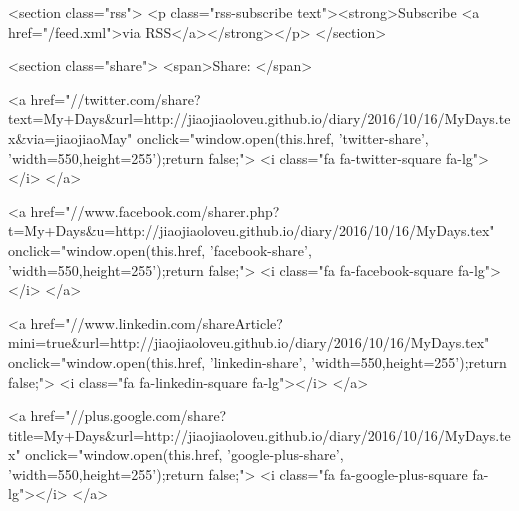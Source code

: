 <section class="rss">
  <p class="rss-subscribe text"><strong>Subscribe <a href="/feed.xml">via RSS</a></strong></p>
</section>

<section class="share">
  <span>Share: </span>
  
    
    
      <a href="//twitter.com/share?text=My+Days&url=http://jiaojiaoloveu.github.io/diary/2016/10/16/MyDays.tex&via=jiaojiaoMay"
        onclick="window.open(this.href, 'twitter-share', 'width=550,height=255');return false;">
        <i class="fa fa-twitter-square fa-lg"></i>
      </a>
    
    
    
    
    
    
  
    
    
    
      <a href="//www.facebook.com/sharer.php?t=My+Days&u=http://jiaojiaoloveu.github.io/diary/2016/10/16/MyDays.tex"
        onclick="window.open(this.href, 'facebook-share', 'width=550,height=255');return false;">
        <i class="fa fa-facebook-square fa-lg"></i>
      </a>
    
    
    
    
    
  
    
    
    
    
    
    
    
  
    
    
    
    
    
      <a href="//www.linkedin.com/shareArticle?mini=true&url=http://jiaojiaoloveu.github.io/diary/2016/10/16/MyDays.tex"
        onclick="window.open(this.href, 'linkedin-share', 'width=550,height=255');return false;">
        <i class="fa fa-linkedin-square fa-lg"></i>
      </a>
    
    
    
  
    
    
    
    
      <a href="//plus.google.com/share?title=My+Days&url=http://jiaojiaoloveu.github.io/diary/2016/10/16/MyDays.tex"
        onclick="window.open(this.href, 'google-plus-share', 'width=550,height=255');return false;">
        <i class="fa fa-google-plus-square fa-lg"></i>
      </a>
    
    
    
    
  
    
    
    
    
